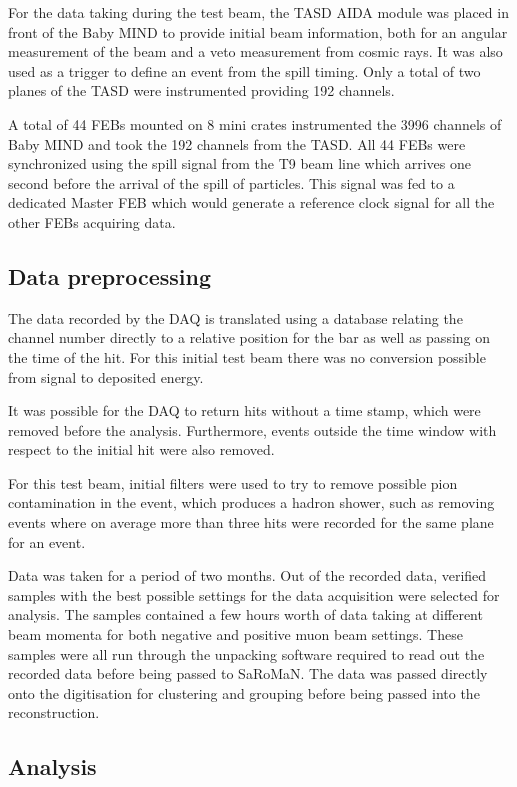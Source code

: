 For the data taking during the test beam, the TASD AIDA module was placed in front of the Baby MIND to provide initial beam information, both for an angular measurement of the beam and a veto measurement from cosmic rays. It was also used as a trigger to define an event from the spill timing. Only a total of two planes of the TASD were instrumented providing 192 channels. 

A total of 44 FEBs mounted on 8 mini crates instrumented the 3996 channels of Baby MIND and took the 192 channels from the TASD. All 44 FEBs were synchronized using the spill signal from the T9 beam line which arrives one second before the arrival of the spill of particles. This signal was fed to a dedicated Master FEB which would generate a reference clock signal for all the other FEBs acquiring data.

\subsection{Data preprocessing}
The data recorded by the DAQ is translated using a database relating the channel number directly to a relative position for the bar as well as passing on the time of the hit. For this initial test beam there was no conversion possible from signal to deposited energy.

It was possible for the DAQ to return hits without a time stamp, which were removed before the analysis. Furthermore, events outside the time window with respect to the initial hit were also removed.

For this test beam, initial filters were used to try to remove possible pion contamination in the event, which produces a hadron shower, such as removing events where on average more than three hits were recorded for the same plane for an event. 

Data was taken for a period of two months. Out of the recorded data, verified samples with the best possible settings for the data acquisition were selected for analysis. The samples contained a few hours worth of data taking at different beam momenta for both negative and positive muon beam settings. These samples were all run through the unpacking software required to read out the recorded data before being passed to SaRoMaN. The data was passed directly onto the digitisation for clustering and grouping before being passed into the reconstruction.

\subsection{Analysis}

